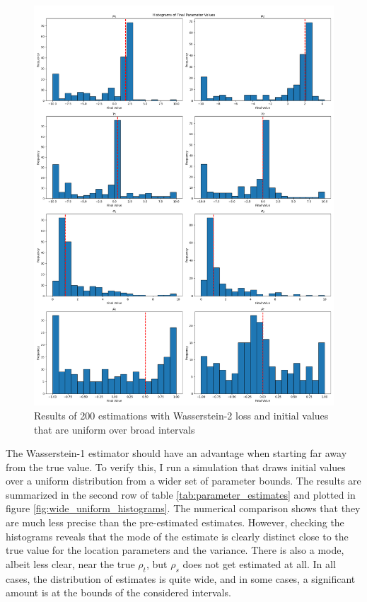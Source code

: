 \begin{figure}
    \includegraphics[width=\textwidth]{./Images/w2_wide_uniform_histograms.png}
    \caption{Results of 200 estimations with Wasserstein-2 loss and initial values that are uniform over broad intervals}
    \label{fig:w2_wide_uniform_histograms}
\end{figure}

The Wasserstein-1 estimator should have an advantage when starting far away from the true value.
To verify this, I run a simulation that draws initial values over a uniform distribution from a wider set of parameter bounds.
The results are summarized in the second row of table \ref{tab:parameter_estimates} and plotted in figure \ref{fig:wide_uniform_histograms}.
The numerical comparison shows that they are much less precise than the pre-estimated estimates.
However, checking the histograms reveals that the mode of the estimate is clearly distinct close to the true value for the location parameters and the variance.
There is also a mode, albeit less clear, near the true $\rho_t$, but $\rho_s$ does not get estimated at all.
In all cases, the distribution of estimates is quite wide, and in some cases, a significant amount is at the bounds of the considered intervals.


